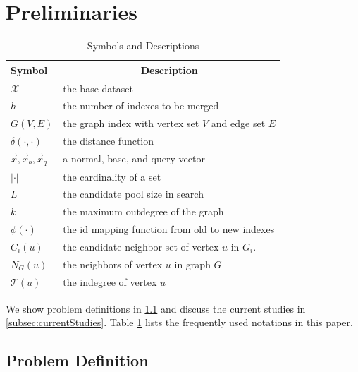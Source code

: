 \documentclass[acmsmall]{acmart}
\theoremstyle{remark}
\theoremstyle{definition}
\begin{document}
\egroup


\section{Preliminaries}
\label{sec:problemDefinition}


\begin{table}
	\vspace{-2ex}
	\centering
	{\small
		\caption{\small Symbols and Descriptions}
		\label{tab:symbols}
		\vspace{-2ex}
		\label{table0}
		\begin{tabular}{l|l}
			\toprule
			{\bf Symbol} & \multicolumn{1}{c}{\bf Description} \\
			\midrule
			${\mathcal{X}}$ & the base dataset \\
			$h$ & the number of indexes to be merged \\
			${G(V, E)}$ & the graph index with vertex set $V$ and edge set $E$ \\
			$\delta(\cdot, \cdot)$ & the distance function \\
			$\vec{x}, \vec{x}_b, \vec{x}_q$ & a normal, base, and query vector \\
			$\lvert \cdot \rvert$ & the cardinality of a set \\ 
			$L$ & the candidate pool size in search \\
			$k$ & the maximum outdegree of the graph \\
			$\phi(\cdot)$ & the id mapping function from old to new indexes \\
			$C_i(u)$ & the candidate neighbor set of vertex $u$ in $G_i$. \\
			$N_G(u)$ & the neighbors of vertex $u$ in graph $G$ \\
			$\mathcal{T}(u)$ & the indegree of vertex $u$ \\
			\bottomrule
		\end{tabular}
	}
	\vspace{-1ex}
\end{table}


We show problem definitions in \textsection\ref{subsec:problemDefinition} and discuss the current studies in \textsection\ref{subsec:currentStudies}. Table \ref{table0} lists the frequently used notations in this paper.

\subsection{Problem Definition}
\label{subsec:problemDefinition}
\end{document}
